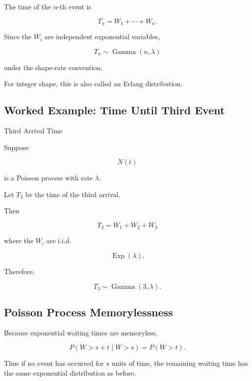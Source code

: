 The time of the \(n\)-th event is

\[
\boxed{
T_n
=
W_1+\cdots+W_n.
}
\]

Since the \(W_i\) are independent exponential variables,

\[
\boxed{
T_n
\sim
\operatorname{Gamma}(n,\lambda)
}
\]

under the shape-rate convention.

For integer shape, this is also called an Erlang distribution.

\subsection{Worked Example: Time Until Third Event}
\label{subsec:worked-third-arrival}

\begin{workedexamplebox}{Third Arrival Time}

Suppose

\[
N(t)
\]

is a Poisson process with rate \(\lambda\).

Let \(T_3\) be the time of the third arrival.

Then

\[
T_3
=
W_1+W_2+W_3
\]

where the \(W_i\) are i.i.d.

\[
\operatorname{Exp}(\lambda).
\]

Therefore,

\begin{answerbox}
\[
\boxed{
T_3
\sim
\operatorname{Gamma}(3,\lambda).
}
\]
\end{answerbox}

\end{workedexamplebox}

\subsection{Poisson Process Memorylessness}
\label{subsec:poisson-memorylessness}

Because exponential waiting times are memoryless,

\[
P(W>s+t\mid W>s)
=
P(W>t).
\]

Thus if no event has occurred for \(s\) units of time, the remaining
waiting time has the same exponential distribution as before.

